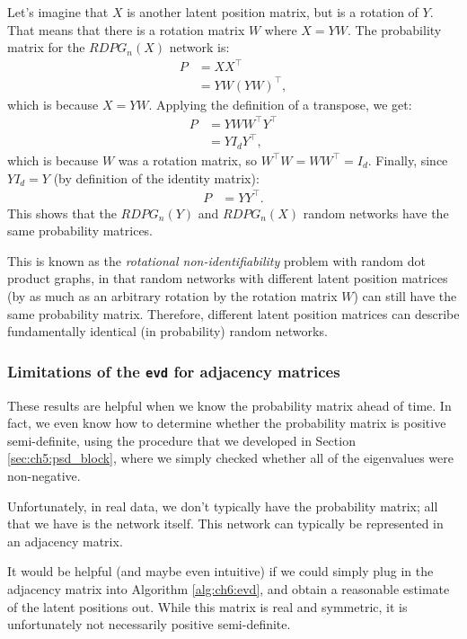 Let's imagine that $X$ is another latent position matrix, but is a rotation of $Y$. That means that there is a rotation matrix $W$ where $X = YW$. The probability matrix for the $RDPG_n(X)$ network is:
\begin{align*}
    P &= XX^\top \\
    &= YW\left(YW\right)^\top,
\end{align*}
which is because $X = YW$. Applying the definition of a transpose, we get:
\begin{align*}
    P &= YW W^\top Y^\top \\
    &= YI_d Y^\top,
\end{align*}
which is because $W$ was a rotation matrix, so $W^\top W = WW^\top = I_d$. Finally, since $YI_d = Y$ (by definition of the identity matrix):
\begin{align*}
    P &= YY^\top.
\end{align*}
This shows that the $RDPG_n(Y)$ and $RDPG_n(X)$ random networks have the same probability matrices.

This is known as the \textit{rotational non-identifiability} problem with random dot product graphs, in that random networks with different latent position matrices (by as much as an arbitrary rotation by the rotation matrix $W$) can still have the same probability matrix. Therefore, different latent position matrices can describe fundamentally identical (in probability) random networks.

\subsubsection{Limitations of the \texttt{evd} for adjacency matrices}

These results are helpful when we know the probability matrix ahead of time. In fact, we even know how to determine whether the probability matrix is positive semi-definite, using the procedure that we developed in Section \ref{sec:ch5:psd_block}, where we simply checked whether all of the eigenvalues were non-negative.


Unfortunately, in real data, we don't typically have the probability matrix; all that we have is the network itself. This network can typically be represented in an adjacency matrix. 

It would be helpful (and maybe even intuitive) if we could simply plug in the adjacency matrix into Algorithm \ref{alg:ch6:evd}, and obtain a reasonable estimate of the latent positions out. While this matrix is real and symmetric, it is unfortunately not necessarily positive semi-definite.

